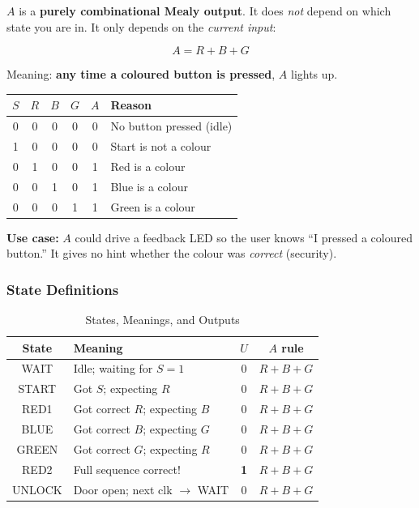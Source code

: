 \documentclass[12pt,a4paper]{article}
\begin{document}
\begin{importantbox}
$A$ is a \textbf{purely combinational Mealy output}. It does \emph{not} depend on which state you are in. It only depends on the \emph{current input}:

$$\boxed{A = R + B + G}$$

Meaning: \textbf{any time a coloured button is pressed}, $A$ lights up.

\medskip
\begin{tabular}{cccccl}
\toprule
$S$ & $R$ & $B$ & $G$ & $A$ & \textbf{Reason} \\
\midrule
0 & 0 & 0 & 0 & 0 & No button pressed (idle) \\
1 & 0 & 0 & 0 & 0 & Start is not a colour \\
0 & 1 & 0 & 0 & 1 & Red is a colour \\
0 & 0 & 1 & 0 & 1 & Blue is a colour \\
0 & 0 & 0 & 1 & 1 & Green is a colour \\
\bottomrule
\end{tabular}

\medskip
\textbf{Use case:} $A$ could drive a feedback LED so the user knows ``I pressed a coloured button.'' It gives no hint whether the colour was \emph{correct} (security).
\end{importantbox}

\subsubsection{State Definitions}

\begin{table}[H]
\centering
\caption{States, Meanings, and Outputs}
\begin{tabular}{clcc}
\toprule
\textbf{State} & \textbf{Meaning} & $U$ & \textbf{$A$ rule} \\
\midrule
WAIT   & Idle; waiting for $S=1$         & 0 & $R+B+G$ \\
START  & Got $S$; expecting $R$           & 0 & $R+B+G$ \\
RED1   & Got correct $R$; expecting $B$   & 0 & $R+B+G$ \\
BLUE   & Got correct $B$; expecting $G$   & 0 & $R+B+G$ \\
GREEN  & Got correct $G$; expecting $R$   & 0 & $R+B+G$ \\
RED2   & Full sequence correct!           & \textbf{1} & $R+B+G$ \\
UNLOCK & Door open; next clk $\to$ WAIT   & 0 & $R+B+G$ \\
\bottomrule
\end{tabular}
\end{table}
\end{document}
